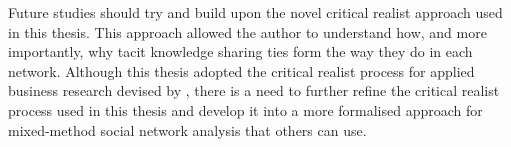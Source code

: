 Future studies should try and build upon the novel critical realist approach used in this thesis. This approach allowed the author to understand how, and more importantly, why tacit knowledge sharing ties form the way they do in each network. Although this thesis adopted the critical realist process for applied business research devised by \citet{mcavoy2018critical}, there is a need to further refine the critical realist process used in this thesis and develop it into a more formalised approach for mixed-method social network analysis that others can use. 


